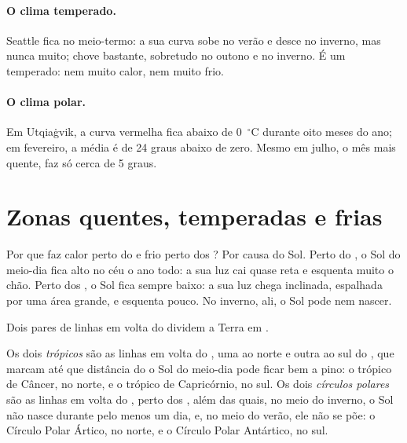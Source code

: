 \paragraph{O clima temperado.} Seattle fica no meio-termo: a sua curva sobe
no verão e desce no inverno, mas nunca muito; chove bastante, sobretudo no
outono e no inverno. É um  temperado: nem muito calor, nem muito frio.

\paragraph{O clima polar.} Em Utqiaġvik, a curva vermelha fica abaixo de
0~$^\circ$C durante oito meses do ano; em fevereiro, a média é de 24 graus
abaixo de zero. Mesmo em julho, o mês mais quente, faz só cerca de
5 graus.

\section{Zonas quentes, temperadas e frias}

Por que faz calor perto do  e frio perto dos ? Por causa do
Sol. Perto do , o Sol do meio-dia fica alto no céu o ano todo: a
sua luz cai quase reta e esquenta muito o chão. Perto dos , o Sol
fica sempre baixo: a sua luz chega inclinada, espalhada por uma área
grande, e esquenta pouco. No inverno, ali, o Sol pode nem nascer.

Dois pares de linhas em volta do  dividem a Terra em .

\begin{definition}\label{def:g5:weather-and-climate:tropics}
Os dois \emph{trópicos} são as linhas em volta do , uma
ao norte e outra ao sul do , que marcam até que distância do
 o Sol do meio-dia pode ficar bem a pino: o trópico de Câncer, no
norte, e o trópico de Capricórnio, no sul. Os dois \emph{círculos
polares} são as linhas em volta do , perto dos
, além das quais, no meio do inverno, o Sol não nasce durante pelo
menos um dia, e, no meio do verão, ele não se põe: o Círculo Polar Ártico,
no norte, e o Círculo Polar Antártico, no sul.
\end{definition}

